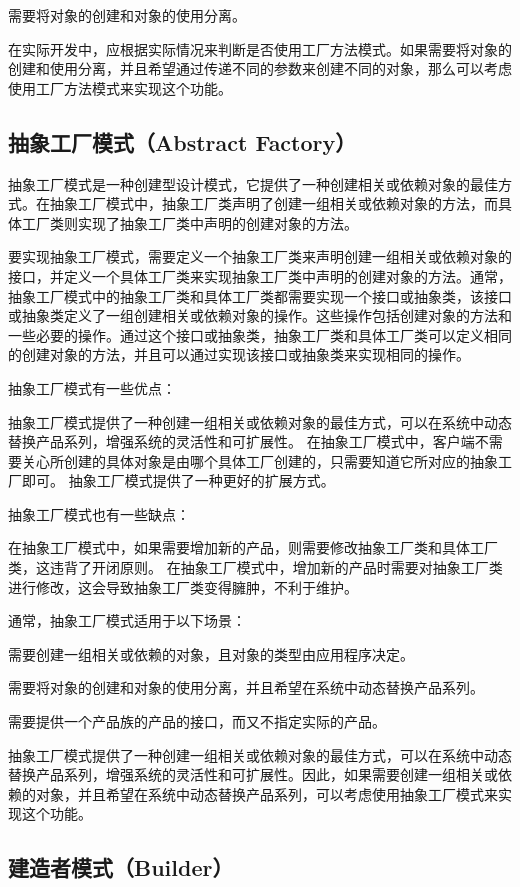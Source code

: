 \documentclass[cn,black,12pt,normal]{elegantnote}
\begin{document}
需要将对象的创建和对象的使用分离。

在实际开发中，应根据实际情况来判断是否使用工厂方法模式。如果需要将对象的创建和使用分离，并且希望通过传递不同的参数来创建不同的对象，那么可以考虑使用工厂方法模式来实现这个功能。

\subsection{抽象工厂模式（Abstract Factory）}

抽象工厂模式是一种创建型设计模式，它提供了一种创建相关或依赖对象的最佳方式。在抽象工厂模式中，抽象工厂类声明了创建一组相关或依赖对象的方法，而具体工厂类则实现了抽象工厂类中声明的创建对象的方法。

要实现抽象工厂模式，需要定义一个抽象工厂类来声明创建一组相关或依赖对象的接口，并定义一个具体工厂类来实现抽象工厂类中声明的创建对象的方法。通常，抽象工厂模式中的抽象工厂类和具体工厂类都需要实现一个接口或抽象类，该接口或抽象类定义了一组创建相关或依赖对象的操作。这些操作包括创建对象的方法和一些必要的操作。通过这个接口或抽象类，抽象工厂类和具体工厂类可以定义相同的创建对象的方法，并且可以通过实现该接口或抽象类来实现相同的操作。

抽象工厂模式有一些优点：

抽象工厂模式提供了一种创建一组相关或依赖对象的最佳方式，可以在系统中动态替换产品系列，增强系统的灵活性和可扩展性。
在抽象工厂模式中，客户端不需要关心所创建的具体对象是由哪个具体工厂创建的，只需要知道它所对应的抽象工厂即可。
抽象工厂模式提供了一种更好的扩展方式。

抽象工厂模式也有一些缺点：

在抽象工厂模式中，如果需要增加新的产品，则需要修改抽象工厂类和具体工厂类，这违背了开闭原则。
在抽象工厂模式中，增加新的产品时需要对抽象工厂类进行修改，这会导致抽象工厂类变得臃肿，不利于维护。

通常，抽象工厂模式适用于以下场景：

需要创建一组相关或依赖的对象，且对象的类型由应用程序决定。

需要将对象的创建和对象的使用分离，并且希望在系统中动态替换产品系列。

需要提供一个产品族的产品的接口，而又不指定实际的产品。

抽象工厂模式提供了一种创建一组相关或依赖对象的最佳方式，可以在系统中动态替换产品系列，增强系统的灵活性和可扩展性。因此，如果需要创建一组相关或依赖的对象，并且希望在系统中动态替换产品系列，可以考虑使用抽象工厂模式来实现这个功能。

\subsection{建造者模式（Builder）}
\end{document}

